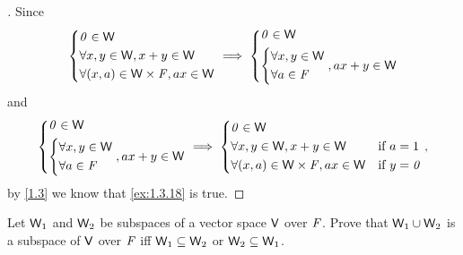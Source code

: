 \begin{proof}[]
	Since
	\[
		\begin{dcases}
			\mathit{0} \in \mathsf{W}                        \\
			\forall x, y \in \mathsf{W}, x + y \in \mathsf{W} \\
			\forall (x, a) \in \mathsf{W} \times \mathit{F}, ax \in \mathsf{W}
		\end{dcases} \implies \begin{dcases}
			\mathit{0} \in \mathsf{W} \\
			\begin{dcases}
				\forall x, y \in \mathsf{W} \\
				\forall a \in \mathit{F}
			\end{dcases}, ax + y \in \mathsf{W}
		\end{dcases}
	\]
	and
	\[
		\begin{dcases}
			\mathit{0} \in \mathsf{W} \\
			\begin{dcases}
				\forall x, y \in \mathsf{W} \\
				\forall a \in \mathit{F}
			\end{dcases}, ax + y \in \mathsf{W}
		\end{dcases} \implies \begin{dcases}
			\mathit{0} \in \mathsf{W}                                                      \\
			\forall x, y \in \mathsf{W}, x + y \in \mathsf{W}          & \text{if } a = 1   \\
			\forall (x, a) \in \mathsf{W} \times \mathit{F}, ax \in \mathsf{W} & \text{if } y = \mathit{0}
		\end{dcases},
	\]
	by \cref{1.3} we know that \cref{ex:1.3.18} is true.
\end{proof}

\begin{ex}\label{ex:1.3.19}
	Let \(\mathsf{W}_1\) and \(\mathsf{W}_2\) be subspaces of a vector space \(\mathsf{V}\) over \(\mathit{F}\).
	Prove that \(\mathsf{W}_1 \cup \mathsf{W}_2\) is a subspace of \(\mathsf{V}\) over \(\mathit{F}\) iff \(\mathsf{W}_1 \subseteq \mathsf{W}_2\) or \(\mathsf{W}_2 \subseteq \mathsf{W}_1\).
\end{ex}

